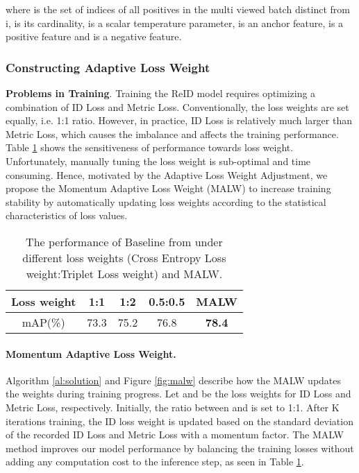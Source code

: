 \documentclass[10pt,twocolumn,letterpaper]{article}
\begin{document}
where  is the set of indices of all positives in the multi viewed batch distinct from i,  is its cardinality,  is a scalar temperature parameter,  is an anchor feature,  is a positive feature and  is a negative feature.

\subsubsection{Constructing Adaptive Loss Weight } \label{sub:calw}
\textbf{Problems in Training}. Training the ReID model requires optimizing a combination of ID Loss and Metric Loss. Conventionally, the loss weights are set equally, i.e. 1:1 ratio. However, in practice, ID Loss is relatively much larger than Metric Loss, which causes the imbalance and affects the training performance. Table \ref{tab:lossweight} shows the sensitiveness of performance towards loss weight. Unfortunately, manually tuning the loss weight is sub-optimal and time consuming. Hence, motivated by the Adaptive Loss Weight Adjustment\cite{awla}, we propose the Momentum Adaptive Loss Weight (MALW) to increase training stability by automatically updating loss weights according to the statistical characteristics of loss values.	
\begin{table}[H]
	\centering
	\begin{tabular}{c| c c c c} 
		\hline
		Loss weight & 1:1 & 1:2 & 0.5:0.5 &MALW \\ [0.5ex] 
		\hline\hline
		mAP(\%) & 73.3 & 75.2 & 76.8 &\textbf{78.4} \\ 
		\hline
	\end{tabular}
	\caption{The performance of Baseline from \cite{2nd} under different loss weights (Cross Entropy Loss weight:Triplet Loss weight) and MALW.}
	\label{tab:lossweight}
\end{table}
\paragraph{Momentum Adaptive Loss Weight.}
Algorithm \ref{al:solution} and Figure \ref{fig:malw} describe how the MALW updates the weights during training progress. Let  and  be the loss weights for ID Loss and Metric Loss, respectively. Initially, the ratio between  and  is set to 1:1. After K iterations training, the ID loss weight  is updated based on the standard deviation of the recorded ID Loss  and Metric Loss  with a momentum factor. The MALW method improves our model performance by balancing the training losses without adding any computation cost to the inference step, as seen in Table \ref{tab:lossweight}.
\end{document}
